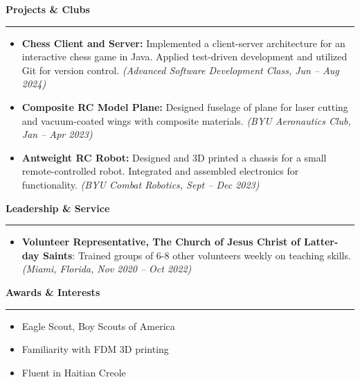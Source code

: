 \documentclass[a4paper,10``pt]{article}
\newcommand{\sectionline}{\noindent\rule{\linewidth}{0.5pt}\vspace{-0.5em}}
\newcommand{\resumeItem}[2]{\item\textbf{#1:} #2}
\begin{document}
\textbf{Projects \& Clubs} \vspace{-1em}\\
\sectionline

\begin{itemize}[noitemsep, topsep=0pt]
    \resumeItem{Chess Client and Server}{Implemented a client-server architecture for an interactive chess game in Java. Applied test-driven development and utilized Git for version control. \emph{(Advanced Software Development Class, Jun -- Aug 2024)}}

    \resumeItem{Composite RC Model Plane}{Designed fuselage of plane for laser cutting and vacuum-coated wings with composite materials. \emph{(BYU Aeronautics Club, Jan -- Apr 2023)}}

    \resumeItem{Antweight RC Robot}{Designed and 3D printed a chassis for a small remote-controlled robot. Integrated and assembled electronics for functionality. \emph{(BYU Combat Robotics, Sept -- Dec 2023)}}
\end{itemize}

\textbf{Leadership \& Service} \vspace{-1em}\\
\sectionline

\begin{itemize}[noitemsep, topsep=0pt]
    \item \textbf{Volunteer Representative, The Church of Jesus Christ of Latter-day Saints}: Trained groups of 6-8 other volunteers weekly on teaching skills. \emph{(Miami, Florida, Nov 2020 -- Oct 2022)}
\end{itemize}

\textbf{Awards \& Interests} \vspace{-1em}\\
\sectionline

\begin{itemize}[noitemsep, topsep=0pt]
    \item Eagle Scout, Boy Scouts of America
    \item Familiarity with FDM 3D printing
    \item Fluent in Haitian Creole
\end{itemize}
\end{document}
